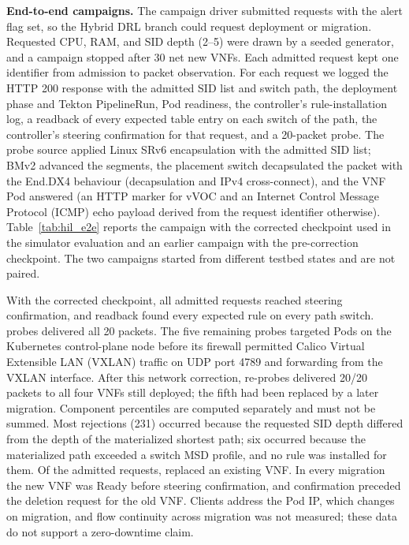 \documentclass[final,5p]{elsarticle}
\newcommand{\rev}[1]{\textcolor{revisiongreen}{#1}}
\let\newrev\rev
\begin{document}
\newrev{\textbf{End-to-end campaigns.} The campaign driver submitted requests with the alert flag set, so the Hybrid DRL branch could request deployment or migration. Requested CPU, RAM, and SID depth (2--5) were drawn by a seeded generator, and a campaign stopped after 30 net new VNFs. Each admitted request kept one identifier from admission to packet observation. For each request we logged the HTTP 200 response with the admitted SID list and switch path, the deployment phase and Tekton PipelineRun, Pod readiness, the controller's rule-installation log, a readback of every expected table entry on each switch of the path, the controller's steering confirmation for that request, and a 20-packet probe. The probe source applied Linux SRv6 encapsulation with the admitted SID list; BMv2 advanced the segments, the placement switch decapsulated the packet with the End.DX4 behaviour (decapsulation and IPv4 cross-connect), and the VNF Pod answered (an HTTP marker for vVOC and an Internet Control Message Protocol (ICMP) echo payload derived from the request identifier otherwise). Table~\ref{tab:hil_e2e} reports the campaign with the corrected checkpoint used in the simulator evaluation and an earlier campaign with the pre-correction checkpoint. The two campaigns started from different testbed states and are not paired.}

\newrev{With the corrected checkpoint, all \HILEtoESteered{} admitted requests reached steering confirmation, and readback found every expected rule on every path switch. \HILEtoEFullProbes{} probes delivered all 20 packets. The five remaining probes targeted Pods on the Kubernetes control-plane node before its firewall permitted Calico Virtual Extensible LAN (VXLAN) traffic on UDP port 4789 and forwarding from the VXLAN interface. After this network correction, re-probes delivered 20/20 packets to all four VNFs still deployed; the fifth had been replaced by a later migration. Component percentiles are computed separately and must not be summed. Most rejections (231) occurred because the requested SID depth differed from the depth of the materialized shortest path; six occurred because the materialized path exceeded a switch MSD profile, and no rule was installed for them. Of the admitted requests, \HILEtoEMigrations{} replaced an existing VNF. In every migration the new VNF was Ready before steering confirmation, and confirmation preceded the deletion request for the old VNF. Clients address the Pod IP, which changes on migration, and flow continuity across migration was not measured; these data do not support a zero-downtime claim.}
\end{document}
